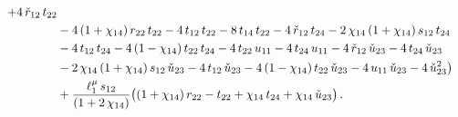 \documentclass[aps,prd,preprint,groupedaddress,nofootinbib,showpacs,eqsecnum]{revtex4}
\begin{document}
\begin{equation}
\begin{aligned}
+4\,\check{r}_{12}\,t_{22}
\\ &
-4\,(1+\chi_{14})\,r_{22}\,t_{22}
-4\,t_{12}\,t_{22}-8\,t_{14}\,t_{22}-4\,\check{r}_{12}\,t_{24}
-2\,\chi_{14}\,(1+\chi_{14})\,s_{12}\,t_{24}
\\ &
-4\,t_{12}\,t_{24}-4\,(1-\chi_{14})\,t_{22}\,t_{24}
-4\,t_{22}\,u_{11}-4\,t_{24}\,u_{11}-4\,\check{r}_{12}\,\check{u}_{23}
-4\,t_{24}\,\check{u}_{23}
\\ &
-2\,\chi_{14}\,(1+\chi_{14})\,s_{12}\,\check{u}_{23}
-4\,t_{12}\,\check{u}_{23}-4\,(1-\chi_{14})\,t_{22}\,\check{u}_{23}
-4\,u_{11}\,\check{u}_{23}-4\,\check{u}_{23}^{2}\bigr)
\\ &
+\frac{\ell_1^\mu\,s_{12}}{(1+2\,\chi_{14})}\bigl((1+\chi_{14})\,r_{22}
-t_{22}+\chi_{14}\,t_{24}
+\chi_{14}\,\check{u}_{23}\bigr)
\,.\\
\end{aligned}
\label{SlashedBoxFifthVectorB}
\end{equation}



%
\end{document}
